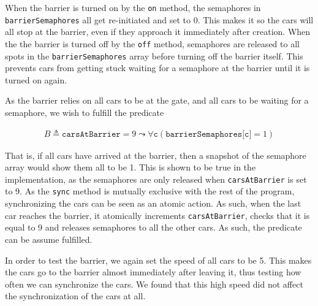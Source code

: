 When the barrier is turned on by the \texttt{on} method, the semaphores in \texttt{barrierSemaphores} all get re-initiated and set to 0. This makes it so the cars will all stop at the barrier, even if they approach it immediately after creation. When the the barrier is turned off by the \texttt{off} method, semaphores are released to all spots in the \texttt{barrierSemaphores} array before turning off the barrier itself. This prevents cars from getting stuck waiting for a semaphore at the barrier until it is turned on again.

As the barrier relies on all cars to be at the gate, and all cars to be waiting for a semaphore, we wish to fulfill the predicate

\begin{gather*}
    B \triangleq \texttt{carsAtBarrier} = 9 \leadsto \forall \texttt{c} \left( \texttt{barrierSemaphores[c]} = 1 \right) 
\end{gather*}

That is, if all cars have arrived at the barrier, then a snapshot of the semaphore array would show them all to be 1. This is shown to be true in the implementation, as the semaphores are only released when \texttt{carsAtBarrier} is set to 9. As the \texttt{sync} method is mutually exclusive with the rest of the program, synchronizing the cars can be seen as an atomic action. As such, when the last car reaches the barrier, it atomically increments \texttt{carsAtBarrier}, checks that it is equal to 9 and releases semaphores to all the other cars. As such, the predicate can be assume fulfilled.

In order to test the barrier, we again set the speed of all cars to be 5. This makes the cars go to the barrier almost immediately after leaving it, thus testing how often we can synchronize the cars. We found that this high speed did not affect the synchronization of the cars at all.